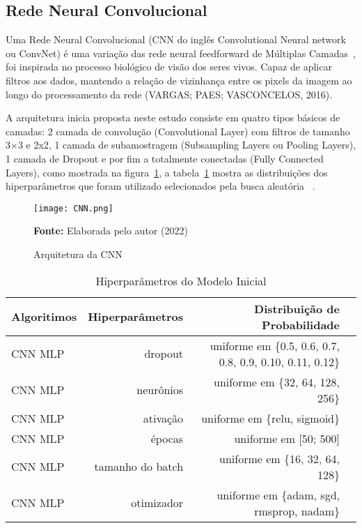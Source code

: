 \subsection{Rede Neural Convolucional}

Uma Rede Neural Convolucional (CNN do inglês Convolutional Neural network ou ConvNet) é uma variação das rede neural feedforward de Múltiplas Camadas~\cite{BISHOP}, foi inspirada no processo biológico de visão dos seres vivos. Capaz de aplicar filtros aos dados, mantendo a relação de vizinhança entre os pixels da imagem ao longo do processamento da rede (VARGAS; PAES; VASCONCELOS, 2016). 

A arquitetura inicia proposta neste estudo consiste em quatro tipos básicos de camadas: 2 camada de convolução (Convolutional Layer) com filtros de tamanho 3×3 e 2x2, 1 camada de subamostragem (Subsampling Layers ou Pooling Layers), 1 camada de Dropout e por fim a totalmente conectadas (Fully Connected Layers), como mostrada na figura~\ref{fig:arquitetura_cnn_}, a tabela~\ref{tabela:hiperparametros_cnn} mostra as distribuições dos hiperparâmetros que foram utilizado selecionados pela busca aleatória  ~\cite{Bergstra_James}.

\begin{figure}[H]
\centering
\texttt{[image: CNN.png]}
\caption{Arquitetura da CNN}
\label{fig:arquitetura_cnn_}
\par\medskip\selectfont\textbf{Fonte:} Elaborada pelo autor (2022) \par\medskip
\end{figure}

\begin{table}[H]
\centering
\caption{Hiperparâmetros do Modelo Inicial}
\label{tabela:hiperparametros_cnn}
\def\arraystretch{1.2}
\begin{tabular}{@{}lrrr@{}}
\toprule
{\textbf{Algoritimos}} & {\textbf{Hiperparâmetros}} & {\textbf{Distribuição de Probabilidade}}  \\
\midrule
CNN MLP & dropout & uniforme em \{0.5, 0.6, 0.7, 0.8, 0.9, 0.10, 0.11, 0.12\} \\ 
CNN MLP & neurônios & uniforme em \{32, 64, 128, 256\} \\ 
CNN MLP & ativação & uniforme em \{relu, sigmoid\} \\ 
CNN MLP & épocas &  uniforme em [50; 500] \\ 
CNN MLP & tamanho do batch &  uniforme em \{16, 32, 64, 128\} \\ 
CNN MLP & otimizador &  uniforme em \{adam, sgd, rmsprop, nadam\} \\ 
\bottomrule
\end{tabular}
\end{table}

